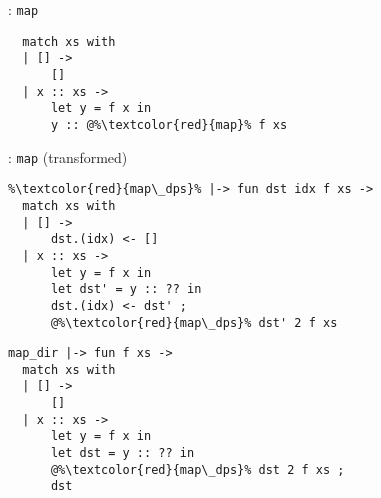 \begin{frame}[fragile]{\DataLang: \texttt{map}}
\begin{lstlisting}[basicstyle=\ttfamily\Large]
%\textcolor{red}{map}% |-> fun f xs ->
  match xs with
  | [] ->
      []
  | x :: xs ->
      let y = f x in
      y :: @%\textcolor{red}{map}% f xs
\end{lstlisting}
\end{frame}

\begin{frame}[fragile]{\DataLang: \texttt{map} (transformed)}
\begin{minipage}{.5\columnwidth}
\begin{lstlisting}
%\textcolor{red}{map\_dps}% |-> fun dst idx f xs ->
  match xs with
  | [] ->
      dst.(idx) <- []
  | x :: xs ->
      let y = f x in
      let dst' = y :: ?? in
      dst.(idx) <- dst' ;
      @%\textcolor{red}{map\_dps}% dst' 2 f xs
\end{lstlisting}
\end{minipage}
\begin{minipage}{.49\columnwidth}
\begin{lstlisting}
map_dir |-> fun f xs ->
  match xs with
  | [] ->
      []
  | x :: xs ->
      let y = f x in
      let dst = y :: ?? in
      @%\textcolor{red}{map\_dps}% dst 2 f xs ;
      dst
\end{lstlisting}
\end{minipage}
\end{frame}

